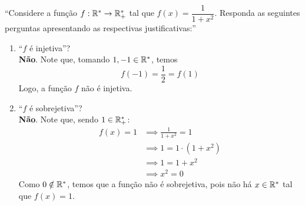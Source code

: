 \enquote{Considere a função $f: \mathbb R^* \rightarrow \mathbb R^*_+$ tal que $f(x) = \dfrac{1}{1 + x^2}$. Responda as seguintes perguntas apresentando as respectivas justificativas:}
\begin{enumerate}
    \item \enquote{$f$ é injetiva}? \\
    \textbf{Não}. Note que, tomando $1, -1 \in \mathbb R^*$, temos
    \begin{displaymath}
        f(-1) = \frac{1}{2} = f(1)
    \end{displaymath}
    Logo, a função $f$ não é injetiva.
    \item \enquote{$f$ é sobrejetiva}? \\
    \textbf{Não}. Note que, sendo $1 \in \mathbb R^*_+$:
    \begin{align*}
        f(x) = 1 & \implies \frac{1}{1 + x^2} = 1 \\ & \implies
        1 = 1 \cdot (1 + x^2) \\ & \implies
        1 = 1 + x^2 \\ & \implies
        x^2 = 0
    \end{align*}
    Como $0 \notin \mathbb R^*$, temos que a função não é sobrejetiva, pois não há $x \in \mathbb R^*$ tal que $f(x) = 1$.
\end{enumerate}